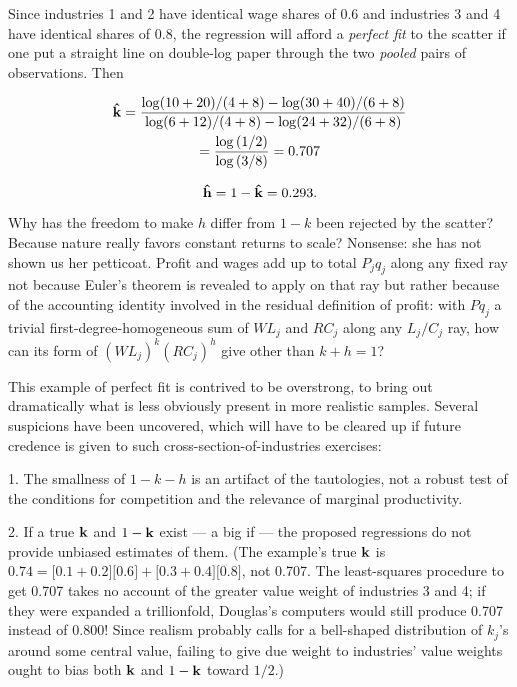 \documentclass{article}
\begin{document}
Since industries 1 and 2 have identical wage shares of 0.6 and industries 3 and 4 have identical shares of 0.8, the regression will afford a \emph{perfect fit} to the scatter if one put a straight line on double-log paper through the two \emph{pooled} pairs of observations. Then

\begin{equation}\label{eq7}
  \begin{gathered}
	\vb{\hat{k}}=\frac{\log (10+20) / (4+8)-\log (30+40) / (6+8)}{\log (6+12) / (4+8)-\log (24+32) / (6+8)}\\
	=\frac{\log {(1/2)}}{\log {(3/8)}} =0.707%
  \end{gathered}
\end{equation}


\begin{equation}\label{eq8}
\vb{\hat{h}}=1-\vb{\hat{k}}=0.293.%
\end{equation}

Why has the freedom to make \(h\) differ from \(1-k\) been rejected by the scatter? Because nature really favors constant returns to scale? Nonsense: she has not shown us her petticoat. Profit and wages add up to total \(P_j q_j \) along any fixed ray not because Euler's theorem is revealed to apply on that ray but rather because of the accounting identity involved in the residual definition of profit: with \(Pq_j \) a trivial first-degree-homogeneous sum of \(WL_j\) and \(RC_j\) along any \(L_j/C_j\) ray, how can its form of \((WL_j )^k (RC_j )^h\) give other than \(k+h=1\)?

This example of perfect fit is contrived to be overstrong, to bring out dramatically what is less obviously present in more realistic samples. Several suspicions have been uncovered, which will have to be cleared up if future credence is given to such cross-section-of-industries exercises:

1. The smallness of \(1-k-h\) is an artifact of the tautologies, not a robust test of the conditions for competition and the relevance of marginal productivity.

2. If a true \(\vb{k}\) and \(1-\vb{k}\) exist --- a big if --- the proposed regressions do not provide unbiased estimates of them. (The example's true \(\vb{k}\) is \(0.74=\lbrack 0.1+0.2\rbrack[0.6\rbrack+\lbrack 0.3+0.4\rbrack\lbrack 0.8\rbrack\), not 0.707. The least-squares procedure to get 0.707 takes no account of the greater value weight of industries 3 and 4; if they were expanded a trillionfold, Douglas's computers would still produce 0.707 instead of 0.800! Since realism probably calls for a bell-shaped distribution of \(k_j\)'s around some central value, failing to give due weight to industries' value weights ought to bias both \(\vb{k}\) and \(1-\vb{k}\) toward \(1/2\).)
\end{document}
